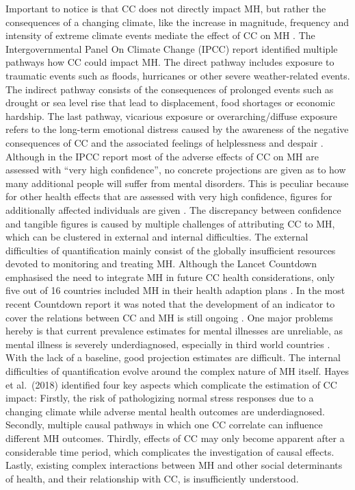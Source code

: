 \documentclass[
]{krantz}
\begin{document}
Important to notice is that CC does not directly impact MH, but rather the consequences of a changing climate, like the increase in magnitude, frequency and intensity of extreme climate events mediate the effect of CC on MH \citep{hayesClimateChangeMental2018}. The Intergovernmental Panel On Climate Change (IPCC) report identified multiple pathways how CC could impact MH. The direct pathway includes exposure to traumatic events such as floods, hurricanes or other severe weather-related events. The indirect pathway consists of the consequences of prolonged events such as drought or sea level rise that lead to displacement, food shortages or economic hardship. The last pathway, vicarious exposure or overarching/diffuse exposure refers to the long-term emotional distress caused by the awareness of the negative consequences of CC and the associated feelings of helplessness and despair \citep{intergovernmentalpanelonclimatechangeClimateChange20222023}.
Although in the IPCC report most of the adverse effects of CC on MH are assessed with ``very high confidence'', no concrete projections are given as to how many additional people will suffer from mental disorders. This is peculiar because for other health effects that are assessed with very high confidence, figures for additionally affected individuals are given \citep{intergovernmentalpanelonclimatechangeClimateChange20222023}.
The discrepancy between confidence and tangible figures is caused by multiple challenges of attributing CC to MH, which can be clustered in external and internal difficulties. The external difficulties of quantification mainly consist of the globally insufficient resources devoted to monitoring and treating MH. Although the Lancet Countdown emphasised the need to integrate MH in future CC health considerations, only five out of 16 countries included MH in their health adaption plans \citep{watts2018ReportLancet2018}. In the most recent Countdown report it was noted that the development of an indicator to cover the relations between CC and MH is still ongoing \citep{romanello2023ReportLancet2023a}. One major problems hereby is that current prevalence estimates for mental illnesses are unreliable, as mental illness is severely underdiagnosed, especially in third world countries \citep{worldhealthorganizationComprehensiveMentalHealth2021}. With the lack of a baseline, good projection estimates are difficult.
The internal difficulties of quantification evolve around the complex nature of MH itself. Hayes et al.~(2018) identified four key aspects which complicate the estimation of CC impact: Firstly, the risk of pathologizing normal stress responses due to a changing climate while adverse mental health outcomes are underdiagnosed. Secondly, multiple causal pathways in which one CC correlate can influence different MH outcomes. Thirdly, effects of CC may only become apparent after a considerable time period, which complicates the investigation of causal effects. Lastly, existing complex interactions between MH and other social determinants of health, and their relationship with CC, is insufficiently understood.
\end{document}
